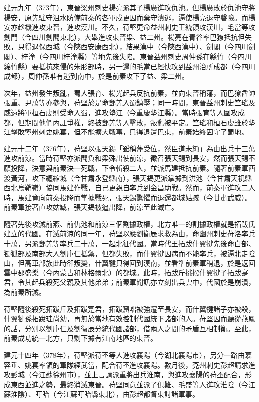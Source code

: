 建元九年（373年），東晉梁州刺史楊亮派其子楊廣進攻仇池。但楊廣敗於仇池守將楊安，原先駐守沮水防備前秦的各軍戍更因而棄守潰逃，逼使楊亮退守磬險。而楊安亦趁機進攻東晉，進攻漢川。不久，苻堅更命益州刺史王統領攻漢川，毛當等攻劍門（今四川劍閣東北），大舉進攻東晉梁、益二州。楊亮在青谷率巴獠抵抗但失敗，只得退保西城（今陝西安康西北），結果漢中（今陝西漢中）、劍閣（今四川劍閣）、梓潼（今四川梓潼縣）等地先後失陷。東晉益州刺史周仲孫在緜竹（今四川綿竹縣）要抵抗來侵的朱肜部時，另一邊的毛當已經快攻到益州治所成都（今四川成都），周仲孫唯有逃到南中，於是前秦攻下了益、梁二州。

次年，益州發生叛亂，蜀人張育、楊光起兵反抗前秦，並向東晉稱藩，而巴獠酋帥張重、尹萬等亦參與，苻堅於是命鄧羌入蜀鎮壓；同一時間，東晉益州刺史竺瑤及威遠將軍桓石虔則受命入蜀，進攻墊江（今重慶墊江縣）。當時張育等人圍攻成都，但期間他們內訌爭權，終被鄧羌等人擊敗，叛亂被平定。竺瑤和桓石虔雖於墊江擊敗寧州刺史姚萇，但不能擴大戰事，只得退還巴東，前秦始終固守了蜀地。

建元十二年（376年），苻堅以張天錫「雖稱藩受位，然臣道未純」為由出兵十三萬進攻前涼。當時苻堅亦派閻負和梁殊出使前涼，徵召張天錫到長安，然而張天錫不願投降，決意與前秦決一死戰，下令斬殺二人，並派馬建抵抗前秦。隨著前秦軍西渡黃河，攻下纏縮城（今甘肅永登縣南），張天錫更派掌據到洪池（今甘肅天祝縣西北烏鞘嶺）協同馬建作戰，自己更親自率兵到金昌助戰。然而，前秦軍進攻二人時，馬建竟向前秦投降而掌據戰死，張天錫驚懼而退還都城姑臧（今甘肅武威）。前秦軍接著直攻姑臧，張天錫被逼出降，前涼至此滅亡。

隨著先後攻滅前燕、前仇池和前涼三個割據政權，北方唯一的割據政權就是拓跋氏建立的代國。在滅前涼的同一年，苻堅以應劉衞辰求救為由，命幽州刺史苻洛率兵十萬，另派鄧羌等率兵二十萬，一起北征代國。當時代王拓跋什翼犍先後命白部、獨狐部及南部大人劉庫仁抵禦，但都失敗，而什翼犍因病而不能率兵，被逼北走陰山，但高車部族此時卻叛變，什翼犍只得回到漠南，並看準前秦軍稍退，於是返回雲中郡盛樂（今內蒙古和林格爾北）的都城。此時，拓跋斤挑撥什翼犍子拓跋寔君，令其起兵殺死父親及其他弟弟；前秦軍聞訊亦立刻出兵雲中，代國於是崩潰，為前秦所滅。

苻堅隨後殺死拓跋斤及拓跋寔君，拓跋窟咄被強遷至長安，而什翼犍諸子亦被殺，什翼犍孫拓跋珪尚幼，再無於當地有效控制代國統下諸部的人。苻堅因而聽從燕鳳的話，分別以劉庫仁及劉衞辰分統代國諸部，借兩人之間的矛盾互相制衡。至此，前秦成功統一北方，只剩下據有江南地區的東晉。

建元十四年（378年），苻堅派苻丕等人進攻襄陽（今湖北襄陽市），另分一路由慕容垂、姚萇率領的軍隊經武當，配合苻丕進攻襄陽。數月後，兗州刺史彭超請求進攻彭城（今江蘇徐州市），並上言請派重將出兵淮南，與進攻襄陽的苻丕配合，形成東西並進之勢，最終消滅東晉。苻堅同意並派了俱難、毛盛等人進攻淮陰（今江蘇淮陰）、盱眙（今江蘇盱眙縣東北），由彭超都督東討諸軍事。

